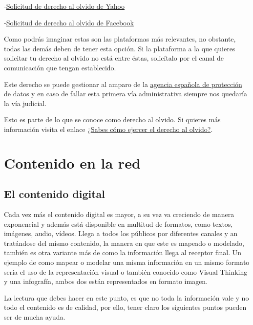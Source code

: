 \documentclass[
  a4paper,
  openany]{book}
\begin{document}
-\href{https://es-us.ayuda.yahoo.com/kb/Eliminaci\%C3\%B3n-de-resultados-de-b\%C3\%BAsqueda-de-Yahoo-Search-sln4530.html}{Solicitud de derecho al olvido de Yahoo}

-\href{https://www.facebook.com/help/217091804975136}{Solicitud de derecho al olvido de Facebook}

Como podrás imaginar estas son las plataformas más relevantes, no obstante, todas las demás deben de tener esta opción. Si la plataforma a la que quieres solicitar tu derecho al olvido no está entre éstas, solicítalo por el canal de comunicación que tengan establecido.

Este derecho se puede gestionar al amparo de la \href{https://www.aepd.es/es/areas-de-actuacion/internet-y-redes-sociales/derecho-al-olvido}{agencia española de protección de datos} y en caso de fallar esta primera vía administrativa siempre nos quedaría la vía judicial.

Esto es parte de lo que se conoce como derecho al olvido. Si quieres más información visita el enlace \href{https://www.osi.es/es/actualidad/blog/2018/09/19/sabes-como-ejercer-el-derecho-al-olvido}{¿Sabes cómo ejercer el derecho al olvido?}.

\hypertarget{contenido-en-la-red}{%
\chapter{Contenido en la red}\label{contenido-en-la-red}}

\hypertarget{el-contenido-digital}{%
\section{El contenido digital}\label{el-contenido-digital}}

Cada vez más el contenido digital es mayor, a su vez va creciendo de manera exponencial y además está disponible en multitud de formatos, como textos, imágenes, audio, vídeos. Llega a todos los públicos por diferentes canales y an tratándose del mismo contenido, la manera en que este es mapeado o modelado, también es otra variante más de como la información llega al receptor final. Un ejemplo de como mapear o modelar una misma información en un mismo formato sería el uso de la representación visual o también conocido como Visual Thinking y una infografía, ambos dos están representados en formato imagen.

La lectura que debes hacer en este punto, es que no toda la información vale y no todo el contenido es de calidad, por ello, tener claro los siguientes puntos pueden ser de mucha ayuda.
\end{document}

